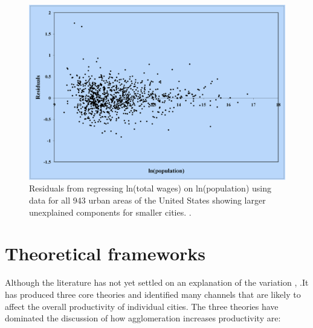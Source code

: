 \begin{figure}[h!tb]
\centering
\includegraphics[scale=0.30]{fig/residuals-lobo.png}
\caption{Residuals from regressing ln(total wages) on ln(population) using data for all 943 urban areas of the United States showing larger unexplained components for smaller cities. \cite{loboUrbanScalingProduction2013}.}
\label{fig-residuals-lobo}
\end{figure}

\section{Theoretical frameworks} %
Although the literature has not yet settled on an explanation of the variation \cite{loboUrbanScalingProduction2013}, \cite{pugaMagnitudeCausesAgglomeration2010}.It has produced three core theories and identified many channels that are likely to affect the overall productivity of individual cities. The three theories have dominated the discussion of how agglomeration increases productivity are:


